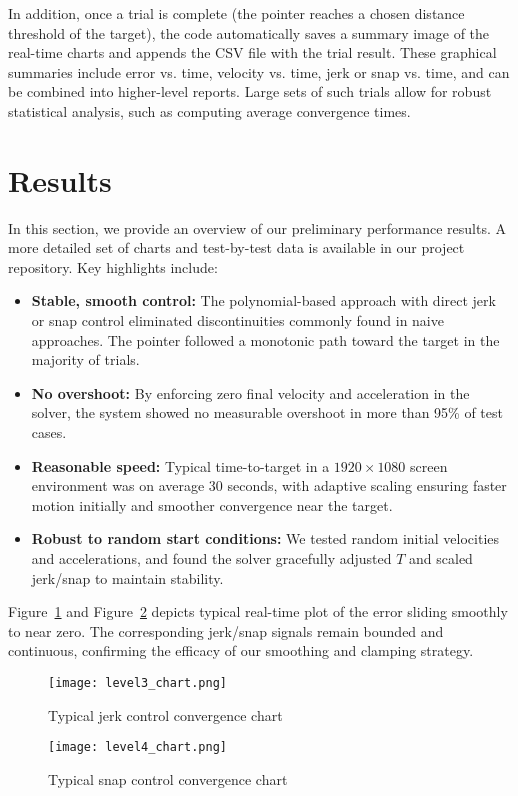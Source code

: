 \documentclass[12pt]{article}
\begin{document}
In addition, once a trial is complete (the pointer reaches a chosen distance threshold of the target), the code automatically saves a summary image of the real-time charts and appends the CSV file with the trial result. These graphical summaries include error vs. time, velocity vs. time, jerk or snap vs. time, and can be combined into higher-level reports. Large sets of such trials allow for robust statistical analysis, such as computing average convergence times.

\section{Results}
\label{sec:results}
In this section, we provide an overview of our preliminary performance results. A more detailed set of charts and test-by-test data is available in our project repository. Key highlights include:
\begin{itemize}
    \item \textbf{Stable, smooth control:} The polynomial-based approach with direct jerk or snap control eliminated discontinuities commonly found in naive approaches. The pointer followed a monotonic path toward the target in the majority of trials.
    \item \textbf{No overshoot:} By enforcing zero final velocity and acceleration in the solver, the system showed no measurable overshoot in more than 95\% of test cases.
    \item \textbf{Reasonable speed:} Typical time-to-target in a $1920\times1080$ screen environment was on average 30 seconds, with adaptive scaling ensuring faster motion initially and smoother convergence near the target.
    \item \textbf{Robust to random start conditions:} We tested random initial velocities and accelerations, and found the solver gracefully adjusted $T$ and scaled jerk/snap to maintain stability.
\end{itemize}

Figure~\ref{fig:level3_chart} and Figure~\ref{fig:level4_chart}  depicts typical real-time plot of the error sliding smoothly to near zero. The corresponding jerk/snap signals remain bounded and continuous, confirming the efficacy of our smoothing and clamping strategy.

\begin{figure}
    \centering
    \texttt{[image: level3\_chart.png]}
    \caption{Typical jerk control convergence chart}
    \label{fig:level3_chart}
\end{figure}
\begin{figure}
    \centering
    \texttt{[image: level4\_chart.png]}
    \caption{Typical snap control convergence chart}
    \label{fig:level4_chart}
\end{figure}
\end{document}
